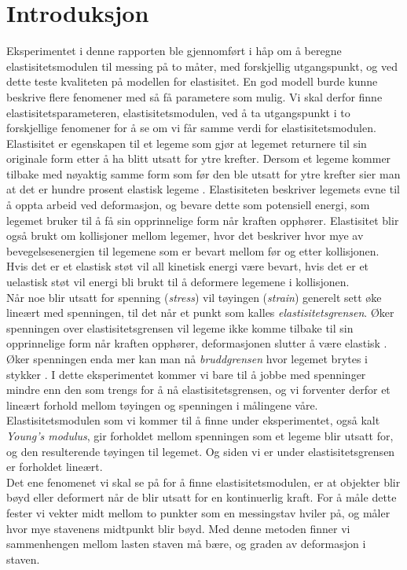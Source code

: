 \documentclass[%
 reprint,
nofootinbib,
aps,
]{revtex4-1}
\begin{document}
\section{Introduksjon}
Eksperimentet i denne rapporten ble gjennomført i håp om å beregne elastisitetsmodulen til messing på to måter, med forskjellig utgangspunkt, og ved dette teste kvaliteten på modellen for elastisitet. En god modell burde kunne beskrive flere fenomener med så få parametere som mulig. Vi skal derfor finne elastisitetsparameteren, elastisitetsmodulen, ved å ta utgangspunkt i to forskjellige fenomener for å se om vi får samme verdi for elastisitetsmodulen.\\
Elastisitet er egenskapen til et legeme som gjør at legemet returnere til sin originale form etter å ha blitt utsatt  for ytre krefter. Dersom et legeme kommer tilbake med nøyaktig samme form som før den ble utsatt for ytre krefter sier man at det er hundre prosent elastisk legeme \cite{gronn}. Elastisiteten beskriver legemets evne til å oppta arbeid ved deformasjon, og bevare dette som potensiell energi, som legemet bruker til å få sin opprinnelige form når kraften opphører. Elastisitet blir også brukt om kollisjoner mellom legemer, hvor det beskriver hvor mye av bevegelsesenergien til legemene som er bevart mellom før og etter kollisjonen. Hvis det er et elastisk støt vil all kinetisk energi være bevart, hvis det er et uelastisk støt vil energi bli brukt til å deformere legemene i kollisjonen.\\
Når noe blir utsatt for spenning (\textit{stress}) vil tøyingen (\textit{strain}) generelt sett øke lineært med spenningen, til det når et punkt som kalles \textit{elastisitetsgrensen}. Øker spenningen over elastisitetsgrensen vil legeme ikke komme tilbake til sin opprinnelige form når kraften opphører, deformasjonen slutter å være elastisk  \cite{gronn}. Øker spenningen enda mer kan man nå \textit{bruddgrensen} hvor legemet brytes i stykker \cite{gronn}. I dette eksperimentet kommer vi bare til å jobbe med spenninger mindre enn den som trengs for å nå elastisitetsgrensen, og vi forventer derfor et lineært forhold mellom tøyingen og spenningen i målingene våre. Elastisitetsmodulen som vi kommer til å finne under eksperimentet, også kalt \textit{Young's modulus}, gir forholdet mellom spenningen som et legeme blir utsatt for, og den resulterende tøyingen til legemet. Og siden vi er under elastisitetsgrensen er forholdet lineært.\\
Det ene fenomenet vi skal se på for å finne elastisitetsmodulen, er at objekter blir bøyd eller deformert når de blir utsatt for en kontinuerlig kraft. For å måle dette fester vi vekter midt mellom to punkter som en messingstav hviler på, og måler hvor mye stavenens midtpunkt blir bøyd. Med denne metoden finner vi sammenhengen mellom lasten staven må bære, og graden av deformasjon i staven.\\
\end{document}
